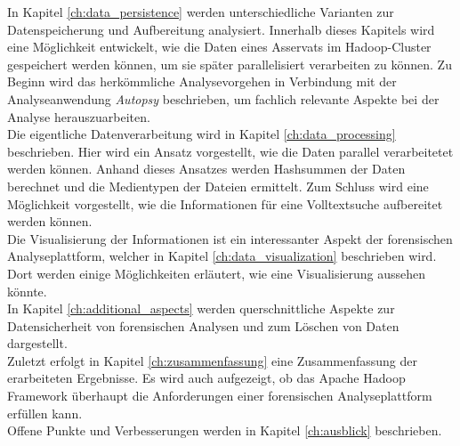 \noindent
In Kapitel \ref{ch:data_persistence} werden unterschiedliche Varianten zur Datenspeicherung und Aufbereitung analysiert. Innerhalb dieses Kapitels wird eine Möglichkeit entwickelt, wie die Daten eines Asservats im Hadoop-Cluster gespeichert werden können, um sie später parallelisiert verarbeiten zu können. Zu Beginn wird das herkömmliche Analysevorgehen in Verbindung mit der Analyseanwendung \textit{Autopsy} beschrieben, um fachlich relevante Aspekte bei der Analyse herauszuarbeiten.\\

\noindent
Die eigentliche Datenverarbeitung wird in Kapitel \ref{ch:data_processing} beschrieben. Hier wird ein Ansatz vorgestellt, wie die Daten parallel verarbeitetet werden können. Anhand dieses Ansatzes werden Hashsummen der Daten berechnet und die Medientypen der Dateien ermittelt. Zum Schluss wird eine Möglichkeit vorgestellt, wie die Informationen für eine Volltextsuche aufbereitet werden können.\\



\noindent
Die Visualisierung der Informationen ist ein interessanter Aspekt der forensischen Analyseplattform, welcher in Kapitel \ref{ch:data_visualization} beschrieben wird. Dort werden einige Möglichkeiten erläutert, wie eine Visualisierung aussehen könnte.\\

\noindent
In Kapitel \ref{ch:additional_aspects} werden querschnittliche Aspekte zur Datensicherheit von forensischen Analysen und zum Löschen von Daten dargestellt.\\

\noindent
Zuletzt erfolgt in Kapitel \ref{ch:zusammenfassung} eine Zusammenfassung der erarbeiteten Ergebnisse. Es wird auch aufgezeigt, ob das Apache Hadoop Framework überhaupt die Anforderungen einer forensischen Analyseplattform erfüllen kann.\\

\noindent
Offene Punkte und Verbesserungen werden in Kapitel \ref{ch:ausblick} beschrieben. 
